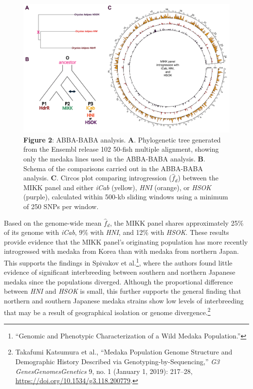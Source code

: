 \documentclass[
  9pt,
]{book}
\begin{document}
\begin{figure}
\includegraphics[width=1\linewidth]{figs/mikk_genome/07_introgression} \caption{\textbf{Figure 2}: ABBA-BABA analysis. \textbf{A}. Phylogenetic tree generated from the Ensembl release 102 50-fish multiple alignment, showing only the medaka lines used in the ABBA-BABA analysis. \textbf{B}. Schema of the comparisons carried out in the ABBA-BABA analysis. \textbf{C}. Circos plot comparing introgression (\(\hat{f}_d\)) between the MIKK panel and either \emph{iCab} (yellow), \emph{HNI} (orange), or \emph{HSOK} (purple), calculated within 500-kb sliding windows using a minimum of 250 SNPs per window.}\label{fig:ABBABABA}
\end{figure}

Based on the genome-wide mean \(\hat{f}_d\), the MIKK panel shares approximately 25\% of its genome with \emph{iCab}, 9\% with \emph{HNI}, and 12\% with \emph{HSOK}. These results provide evidence that the MIKK panel's originating population has more recently introgressed with medaka from Korea than with medaka from northern Japan. This supports the findings in Spivakov et al.\footnote{{``Genomic and {Phenotypic Characterization} of a {Wild Medaka Population}.''}}, where the authors found little evidence of significant interbreeding between southern and northern Japanese medaka since the populations diverged. Although the proportional difference between \emph{HNI} and \emph{HSOK} is small, this further supports the general finding that northern and southern Japanese medaka strains show low levels of interbreeding that may be a result of geographical isolation or genome divergence.\footnote{Takafumi Katsumura et al., {``Medaka {Population Genome Structure} and {Demographic History Described} via {Genotyping-by-Sequencing},''} \emph{G3 Genes\textbar Genomes\textbar Genetics} 9, no. 1 (January 1, 2019): 217--28, \url{https://doi.org/10.1534/g3.118.200779}.}
\end{document}
